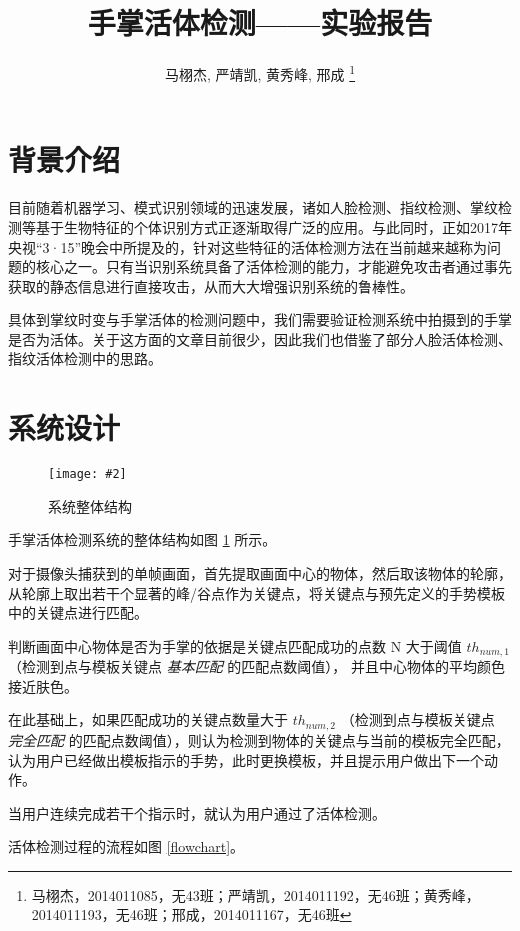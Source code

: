 \documentclass[a4paper, fontset=none]{article}
\newcommand{\img}[2]{\begin{center}\texttt{[image: \#2]}\end{center}}
\begin{document}
\title{手掌活体检测——实验报告}
\author{马栩杰, 严靖凯, 黄秀峰, 邢成 \footnote{马栩杰，2014011085，无43班；严靖凯，2014011192，无46班；黄秀峰，2014011193，无46班；邢成，2014011167，无46班}}
\maketitle

\section{背景介绍}

目前随着机器学习、模式识别领域的迅速发展，诸如人脸检测、指纹检测、掌纹检测等基于生物特征的个体识别方式正逐渐取得广泛的应用。与此同时，正如2017年央视“3·15”晚会中所提及的，针对这些特征的活体检测方法在当前越来越称为问题的核心之一。只有当识别系统具备了活体检测的能力，才能避免攻击者通过事先获取的静态信息进行直接攻击，从而大大增强识别系统的鲁棒性。

具体到掌纹时变与手掌活体的检测问题中，我们需要验证检测系统中拍摄到的手掌是否为活体。关于这方面的文章目前很少，因此我们也借鉴了部分人脸活体检测、指纹活体检测中的思路。

\section{系统设计}

\begin{figure}
    \img{1}{system.png}
    \caption{系统整体结构}
    \label{system}
\end{figure}

手掌活体检测系统的整体结构如图 \ref{system} 所示。

对于摄像头捕获到的单帧画面，首先提取画面中心的物体，然后取该物体的轮廓，从轮廓上取出若干个显著的峰/谷点作为关键点，将关键点与预先定义的手势模板中的关键点进行匹配。

判断画面中心物体是否为手掌的依据是关键点匹配成功的点数 N 大于阈值 $ th_{num, 1} $ （检测到点与模板关键点 \emph{基本匹配} 的匹配点数阈值）， 并且中心物体的平均颜色接近肤色。

在此基础上，如果匹配成功的关键点数量大于 $ th_{num, 2} $ （检测到点与模板关键点 \emph{完全匹配} 的匹配点数阈值），则认为检测到物体的关键点与当前的模板完全匹配，认为用户已经做出模板指示的手势，此时更换模板，并且提示用户做出下一个动作。

当用户连续完成若干个指示时，就认为用户通过了活体检测。

活体检测过程的流程如图 \ref{flowchart}。
\end{document}
